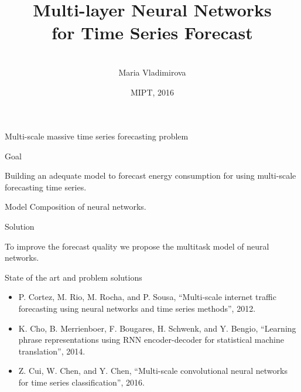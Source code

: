 \documentclass[xcolor=table]{beamer}
\title[\hbox to 56mm{Composition of neural networks  \hfill\insertframenumber\,/\,\inserttotalframenumber}]
{Multi-layer Neural Networks \\ for Time Series Forecast}
\author[M. Vladimirova]{\large \\Maria Vladimirova}
\institute{\footnotesize{
Moscow Institute of Physics and Technology
\vspace{0.3cm} \\
    Supervisor:  Vadim\,Strijov}}
\date{\footnotesize{MIPT, 2016}}
\begin{document}
\begin{frame}
\titlepage
\end{frame}
\begin{frame}{Multi-scale massive time series forecasting problem}
	
	\begin{block}{Goal}

		Building an adequate model to forecast energy consumption for using multi-scale forecasting time series.
	\end{block}

	\begin{block}{Model}
		Composition of neural networks.
	\end{block}

	\begin{block}{Solution}

		To improve the forecast quality we propose the multitask model of neural networks. 
	\end{block}

\end{frame}
\begin{frame}{State of the art and problem solutions}

	\begin{itemize}
			\item{\footnotesize P. Cortez, M. Rio, M. Rocha, and P. Sousa, ``Multi-scale internet traffic forecasting using neural networks and time series methods'', 2012.}
			
			\item{\footnotesize K. Cho, B. Merrienboer, F. Bougares, H. Schwenk, and Y. Bengio, ``Learning phrase representations using RNN encoder-decoder for statistical machine translation'', 2014.} 
				 
			\item{\footnotesize Z. Cui, W. Chen, and Y. Chen, ``Multi-scale convolutional neural networks for time series classification'', 2016. }
				
	\end{itemize}

\end{frame}
\end{document}
